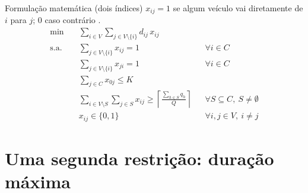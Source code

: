 \documentclass[aspectratio=169,xcolor=table]{beamer}
\begin{document}
\begin{frame}{Formulação matemática (dois índices)}
  $x_{ij} = 1$ se algum veículo vai diretamente de $i$ para $j$; $0$ caso contrário \cite{laporte1985optimal}.
  \begin{align*}
    \min\quad & \sum_{i \in V}\sum_{j \in V \setminus \{i\}} d_{ij}\, x_{ij} \\
    \text{s.a.}\quad
      & \textstyle\sum_{j \in V \setminus \{i\}} x_{ij} = 1 && \forall i \in C\\
      & \textstyle\sum_{j \in V \setminus \{i\}} x_{ji} = 1 && \forall i \in C\\
      & \textstyle\sum_{j \in C} x_{0j} \le K \\
      & \textstyle\sum_{i \in V \setminus S}\sum_{j \in S} x_{ij} \ge \left\lceil \frac{\sum_{h \in S} q_h}{Q} \right\rceil && \forall S \subseteq C,\ S \neq \emptyset\\
      & x_{ij} \in \{0,1\} && \forall i, j \in V,\ i \neq j
  \end{align*}
\end{frame}

\section{Uma segunda restrição: duração máxima}
\end{document}
